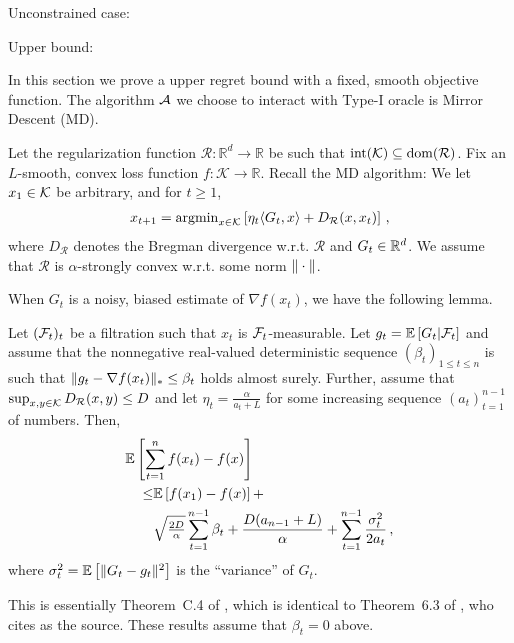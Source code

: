 
Unconstrained case:

Upper bound: 

In this section we prove a upper regret bound with a fixed, smooth objective function. 
The algorithm $\mathcal{A}$ we choose to interact with Type-I oracle is Mirror Descent (MD).

Let the regularization function $\mathcal{R}:\mathbb{R}^d\to \mathbb{R}$ be such that $\operatorname{int}(\mathcal{K})\subseteq \operatorname{dom}(\mathcal{R})$. Fix an $L$-smooth, convex loss function $f: \mathcal{K} \to \mathbb{R}$. 
Recall the MD algorithm: We let $x_1\in \mathcal{K}$ be arbitrary,
and for $t\ge 1$, 
\begin{align*}
x_{t+1}=\operatorname{argmin}_{x\in \mathcal{K}}\left[ \eta_{t} \langle G_t,x \rangle+D_{\mathcal{R}}(x,x_t) \right] \,,
\end{align*}
where $D_{\mathcal{R}}$ denotes the Bregman divergence w.r.t. $\mathcal{R}$ and $G_t \in \mathbb{R}^d$.
We assume that $\mathcal{R}$ is $\alpha$-strongly convex w.r.t. some norm $\|\cdot\|$. 

When $G_t$ is a noisy, biased estimate of $\nabla f(x_t)$, we have the following lemma.
\begin{lemma}
Let $(\mathcal{F}_t)_{t}$ be a filtration such that $x_t$ is $\mathcal{F}_t$-measurable.
Let $g_t = \mathbb{E}\left[G_t|\mathcal{F}_t\right]$ 
and assume that the nonnegative real-valued deterministic sequence $(\beta_t)_{1\le t\le n}$ is such that 
$\|g_t - \nabla f(x_t)\|_* \le \beta_t$ holds almost surely. 
Further, assume that $\sup_{x,y\in \mathcal{K}} D_{\mathcal{R}}(x,y) \le D$ and let $\eta_t = \frac{\alpha}{a_t+L}$ for some increasing 
sequence $(a_t)_{t=1}^{n-1}$ of numbers. Then, 
\begin{align*}
\MoveEqLeft \EE{ \sum_{t=1}^n f(x_t) - f(x) }  \\
\le& 	 \EE{f(x_1)-f(x)}+ \\
 & \sqrt{\tfrac{2D}{\alpha}} \sum_{t=1}^{n-1} \beta_t 
 +\frac{D(a_{n-1}+L)}{\alpha} +
	  \sum_{t=1}^{n-1}\frac{\sigma_t^2}{2a_t}\,,
\end{align*}
where $\sigma_t^2 = \mathbb{E}\left[ \|G_t-g_t\|^2\right]$ is the ``variance'' of $G_t$.
\end{lemma}
This is essentially Theorem~C.4 of \cite{MahdaviPhd:2014}, which is identical to Theorem~6.3 of \cite{Bu:Convex14}, who cites \cite{Dekel:minibatch12} as the source. These results assume that $\beta_t=0$ above.

